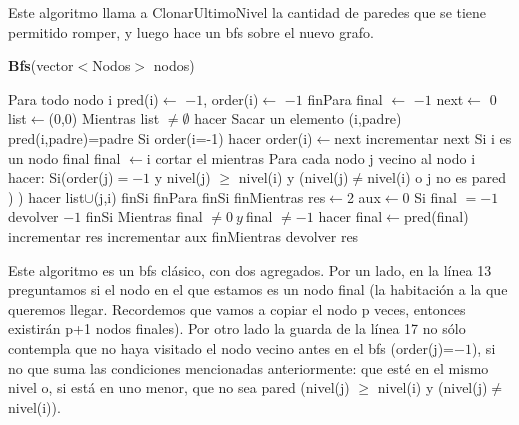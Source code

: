 \documentclass[spanish,12pt]{article}
\begin{document}
Este algoritmo llama a ClonarUltimoNivel la cantidad de paredes que se tiene permitido romper, y luego hace un bfs sobre el nuevo grafo.


\begin{algorithm}[H]{\textbf{Bfs}(vector$<$Nodos$>$ nodos)}
	\begin{algorithmic}[1]
		\State \quad Para todo nodo i
			\State \quad \quad  pred(i)$\gets$ $-1$, order(i)$\gets$ $-1$
		\State \quad finPara
		\State \quad final $\gets$ $-1$
		\State \quad next$\gets$ 0
		\State \quad list$\gets${(0,0)}
		\State \quad Mientras list $\neq \emptyset$ hacer
			\State \quad \quad Sacar un elemento (i,padre)
			\State \quad \quad pred(i,padre)=padre
			\State \quad \quad Si order(i=-1) hacer
				\State \quad \quad \quad order(i)$\gets$next
				\State \quad \quad \quad incrementar next
				\State \quad \quad \quad Si i es un nodo final
					\State \quad \quad \quad \quad final $\gets$i
					\State \quad \quad \quad \quad cortar el mientras
				\State \quad \quad \quad Para cada nodo j vecino al nodo i hacer:
					\State \quad \quad \quad \quad Si(order(j)$=-1$ y nivel(j) $\geq$ nivel(i) y (nivel(j)$\neq$nivel(i) o j no es pared )  ) hacer
						 \State \quad \quad \quad \quad \quad list$\cup${(j,i)}
					\State \quad \quad \quad \quad finSi
				\State \quad \quad \quad   finPara
			\State \quad \quad  finSi
		\State \quad finMientras
		\State \quad res$\gets$2
		\State \quad aux$\gets$0
		\State \quad Si final $= -1$
		\State \quad \quad devolver $-1$
		\State \quad finSi		
		\State \quad Mientras  final $\neq 0 \ y \ $final $\neq -1 $ hacer
			\State \quad \quad  final$\gets$pred(final)
			\State \quad \quad incrementar res
			\State \quad \quad incrementar aux
		\State \quad finMientras
		\State \quad devolver res


	\end{algorithmic}
\end{algorithm}
Este algoritmo es un bfs clásico, con dos agregados. Por un lado, en la línea 13 preguntamos si el nodo en el que estamos es un nodo final (la habitación a la que queremos llegar. Recordemos que vamos a copiar el nodo p veces, entonces existirán p+1 nodos finales). Por otro lado la guarda de la línea 17 no sólo contempla que no haya visitado el nodo vecino antes en el bfs (order(j)=$-1$), si no que suma las condiciones mencionadas anteriormente: que esté en el mismo nivel o, si está en uno menor, que  no sea pared (nivel(j) $\geq$ nivel(i) y (nivel(j)$\neq$nivel(i)).
\end{document}
